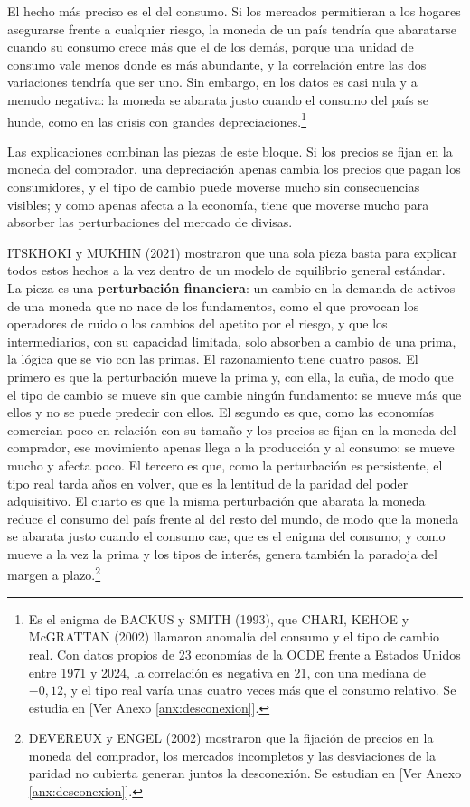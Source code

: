 \documentclass[10pt,a4paper]{article}
\newcommand{\authorfont}[1]{{\fontfamily{EBGaramond-TLF}\selectfont #1}}
\begin{document}
El hecho más preciso es el del consumo. Si los mercados permitieran a los hogares asegurarse frente a cualquier riesgo, la moneda de un país tendría que abaratarse cuando su consumo crece más que el de los demás, porque una unidad de consumo vale menos donde es más abundante, y la correlación entre las dos variaciones tendría que ser uno. Sin embargo, en los datos es casi nula y a menudo negativa: la moneda se abarata justo cuando el consumo del país se hunde, como en las crisis con grandes depreciaciones.\footnote{%
    Es el enigma de BACKUS y SMITH (1993), que CHARI, KEHOE y McGRATTAN (2002) llamaron anomalía del consumo y el tipo de cambio real. Con datos propios de 23 economías de la OCDE frente a Estados Unidos entre 1971 y 2024, la correlación es negativa en 21, con una mediana de $-0{,}12$, y el tipo real varía unas cuatro veces más que el consumo relativo. Se estudia en [\authorfont{Ver Anexo \ref{anx:desconexion}}].
}

Las explicaciones combinan las piezas de este bloque. Si los precios se fijan en la moneda del comprador, una depreciación apenas cambia los precios que pagan los consumidores, y el tipo de cambio puede moverse mucho sin consecuencias visibles; y como apenas afecta a la economía, tiene que moverse mucho para absorber las perturbaciones del mercado de divisas. 

ITSKHOKI y MUKHIN (2021) mostraron que una sola pieza basta para explicar todos estos hechos a la vez dentro de un modelo de equilibrio general estándar. La pieza es una \textbf{perturbación financiera}: un cambio en la demanda de activos de una moneda que no nace de los fundamentos, como el que provocan los operadores de ruido o los cambios del apetito por el riesgo, y que los intermediarios, con su capacidad limitada, solo absorben a cambio de una prima, la lógica que se vio con las primas. El razonamiento tiene cuatro pasos. El primero es que la perturbación mueve la prima y, con ella, la cuña, de modo que el tipo de cambio se mueve sin que cambie ningún fundamento: se mueve más que ellos y no se puede predecir con ellos. El segundo es que, como las economías comercian poco en relación con su tamaño y los precios se fijan en la moneda del comprador, ese movimiento apenas llega a la producción y al consumo: se mueve mucho y afecta poco. El tercero es que, como la perturbación es persistente, el tipo real tarda años en volver, que es la lentitud de la paridad del poder adquisitivo. El cuarto es que la misma perturbación que abarata la moneda reduce el consumo del país frente al del resto del mundo, de modo que la moneda se abarata justo cuando el consumo cae, que es el enigma del consumo; y como mueve a la vez la prima y los tipos de interés, genera también la paradoja del margen a plazo.\footnote{%
    DEVEREUX y ENGEL (2002) mostraron que la fijación de precios en la moneda del comprador, los mercados incompletos y las desviaciones de la paridad no cubierta generan juntos la desconexión. Se estudian en [\authorfont{Ver Anexo \ref{anx:desconexion}}].
}
\end{document}
